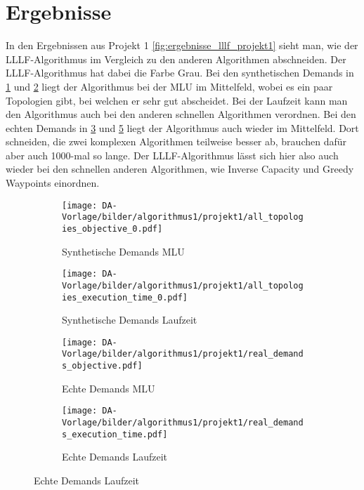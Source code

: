 \section{Ergebnisse}

    In den Ergebnissen aus Projekt 1 \ref{fig:ergebnisse_lllf_projekt1} sieht man, wie der LLLF-Algorithmus im Vergleich zu den anderen Algorithmen abschneiden. Der LLLF-Algorithmus hat dabei die Farbe Grau. Bei den synthetischen Demands in \ref{fig:ergebnisse_lllf_projekt1_1} und \ref{fig:ergebnisse_lllf_projekt1_2} liegt der Algorithmus bei der MLU im Mittelfeld, wobei es ein paar Topologien gibt, bei welchen er sehr gut abscheidet. Bei der Laufzeit kann man den Algorithmus auch bei den anderen schnellen Algorithmen verordnen. 
    Bei den echten Demands in \ref{fig:ergebnisse_lllf_projekt1_3} und \ref{fig:ergebnisse_lllf_projekt1_4} liegt der Algorithmus auch wieder im Mittelfeld. Dort schneiden, die zwei komplexen Algorithmen teilweise besser ab, brauchen dafür aber auch 1000-mal so lange. Der LLLF-Algorithmus lässt sich hier also auch wieder bei den schnellen anderen Algorithmen, wie Inverse Capacity und Greedy Waypoints einordnen. 
    \begin{figure}
        \centering
        \caption{Ergebnisse LLLF Projekt 1}
        \label{fig:ergebnisse_lllf_projekt1}
        \begin{subfigure}{1.0\textwidth}
            \centering
            \caption{Synthetische Demands MLU}
            \label{fig:ergebnisse_lllf_projekt1_1}
            \texttt{[image: DA-Vorlage/bilder/algorithmus1/projekt1/all\_topologies\_objective\_0.pdf]}
        \end{subfigure}
        \begin{subfigure}{1.0\textwidth}
            \centering
            \caption{Synthetische Demands Laufzeit}
            \label{fig:ergebnisse_lllf_projekt1_2}
            \texttt{[image: DA-Vorlage/bilder/algorithmus1/projekt1/all\_topologies\_execution\_time\_0.pdf]}
        \end{subfigure}
        \begin{subfigure}{0.45\textwidth}
            \centering
            \caption{Echte Demands MLU}
            \label{fig:ergebnisse_lllf_projekt1_3}
            \texttt{[image: DA-Vorlage/bilder/algorithmus1/projekt1/real\_demands\_objective.pdf]}
        \end{subfigure}
        \begin{subfigure}{0.45\textwidth}
            \centering
            \caption{Echte Demands Laufzeit}
            \label{fig:ergebnisse_lllf_projekt1_4}
            \texttt{[image: DA-Vorlage/bilder/algorithmus1/projekt1/real\_demands\_execution\_time.pdf]}
        \end{subfigure}
    \end{figure}

